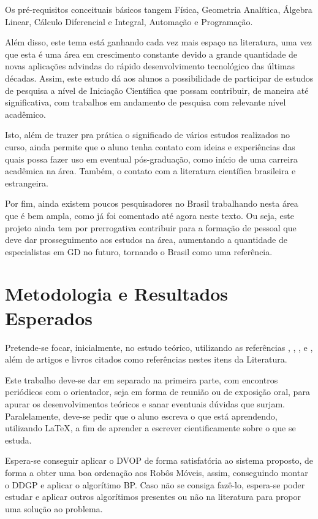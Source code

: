 \documentclass[11pt]{article}
\begin{document}
Os pré-requisitos conceituais básicos tangem Física, Geometria Analítica, Álgebra Linear, Cálculo Diferencial e Integral, Automação e Programação.

Além disso, este tema está ganhando cada vez mais espaço na literatura, uma vez que esta é uma área em crescimento constante devido a grande quantidade de novas aplicações advindas do rápido desenvolvimento tecnológico das últimas décadas. Assim, este estudo dá aos alunos a possibilidade de participar de estudos de pesquisa a nível de Iniciação Científica que possam contribuir, de maneira até significativa, com trabalhos em andamento de pesquisa com relevante nível acadêmico.

Isto, além de trazer pra prática o significado de vários estudos realizados no curso, ainda permite que o aluno tenha contato com ideias e experiências das quais possa fazer uso em eventual pós-graduação, como início de uma carreira acadêmica na área. Também, o contato com a literatura científica brasileira e estrangeira.

Por fim, ainda existem poucos pesquisadores no Brasil trabalhando nesta área que é bem ampla, como já foi comentado até agora neste texto. Ou seja, este projeto ainda tem por prerrogativa contribuir para a formação de pessoal que deve dar prosseguimento aos estudos na área, aumentando a quantidade de especialistas em GD no futuro, tornando o Brasil como uma referência.


\section{Metodologia e Resultados Esperados}
 
Pretende-se focar, inicialmente, no estudo teórico, utilizando as referências \cite{savvides2001dynamic}, , \cite{carlile:MinimalOrder}, \cite{carlileGDandAplications} e \cite{carlile:DDGP}, além de artigos e livros citados como referências nestes itens da Literatura. 

Este trabalho deve-se dar em separado na primeira parte, com encontros periódicos com o orientador, seja em forma de reunião ou de exposição oral, para apurar os desenvolvimentos teóricos e sanar eventuais dúvidas que surjam. Paralelamente, deve-se pedir que o aluno escreva o que está aprendendo, utilizando LaTeX, a fim de aprender a escrever cientificamente sobre o que se estuda.

Espera-se conseguir aplicar o DVOP de forma satisfatória ao sistema proposto, de forma a obter uma boa ordenação aos Robôs Móveis, assim, conseguindo montar o DDGP e aplicar o algorítimo BP. Caso não se consiga fazê-lo, espera-se poder estudar e aplicar outros algorítimos presentes ou não na literatura para propor uma solução ao problema. 
\end{document}
